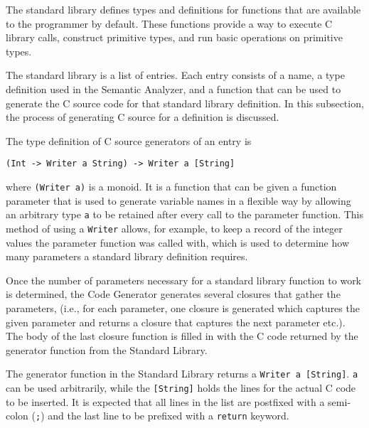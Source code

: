 \documentclass[12pt]{article}
\begin{document}
The standard library defines types and definitions for functions that are
available to the programmer by default. These functions provide a way to execute
C library calls, construct primitive types, and run basic operations on
primitive types.

The standard library is a list of entries. Each entry consists of a name, a type
definition used in the Semantic Analyzer, and a function that can be used to
generate the C source code for that standard library definition. In this
subsection, the process of generating C source for a definition is discussed.

The type definition of C source generators of an entry is
\begin{lstlisting}
(Int -> Writer a String) -> Writer a [String]
\end{lstlisting}
where \verb$(Writer a)$ is a monoid. It is a function that can be given a
function parameter that is used to generate variable names in a flexible way by
allowing an arbitrary type \verb$a$ to be retained after every call to the
parameter function. This method of using a \verb$Writer$ allows, for example, to
keep a record of the integer values the parameter function was called with,
which is used to determine how many parameters a standard library definition
requires.

Once the number of parameters necessary for a standard library function to work
is determined, the Code Generator generates several closures that gather the
parameters, (i.e., for each parameter, one closure is generated which captures
the given parameter and returns a closure that captures the next parameter
etc.). The body of the last closure function is filled in with the C code
returned by the generator function from the Standard Library.

The generator function in the Standard Library returns a 
\verb$Writer a [String]$. \verb$a$ can be used arbitrarily, while the
\verb$[String]$ holds the lines for the actual C code to be inserted. It is
expected that all lines in the list are postfixed with a semi-colon (\verb$;$)
and the last line to be prefixed with a \verb$return$ keyword.
\end{document}
